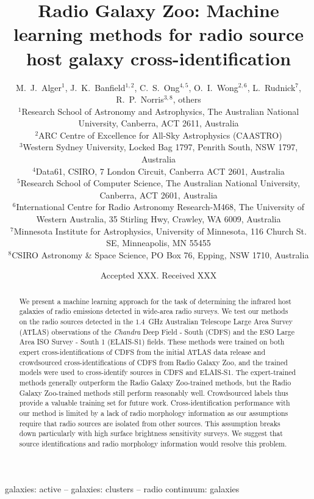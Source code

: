 \documentclass[fleqn,usenatbib,usedcolumn]{mnras}
\title[Machine learning methods for radio source cross-identification]{Radio Galaxy Zoo: Machine learning methods for radio source host galaxy cross-identification}
\author[Alger et al.]{M.~J.~Alger$^{1}$, J.~K.~Banfield$^{1, 2}$, C.~S.~Ong$^{4, 5}$, O.~I.~Wong$^{2, 6}$, L.~Rudnick$^{7}$, R.~P.~Norris$^{3, 8}$, others
\\
$^{1}$Research School of Astronomy and Astrophysics, The Australian National University, Canberra, ACT 2611, Australia\\
$^{2}$ARC Centre of Excellence for All-Sky Astrophysics (CAASTRO)\\
$^{3}$Western Sydney University, Locked Bag 1797, Penrith South, NSW 1797, Australia\\
$^{4}$Data61, CSIRO, 7 London Circuit, Canberra ACT 2601, Australia\\
$^{5}$Research School of Computer Science, The Australian National University, Canberra, ACT 2601, Australia\\
$^{6}$International Centre for Radio Astronomy Research-M468, The University of Western Australia, 35 Stirling Hwy, Crawley, WA 6009, Australia\\
$^{7}$Minnesota Institute for Astrophysics, University of Minnesota, 116 Church St. SE, Minneapolis, MN 55455\\
$^{8}$CSIRO Astronomy \& Space Science, PO Box 76, Epping, NSW 1710, Australia
}
\date{Accepted XXX. Received XXX}
\begin{document}
\label{firstpage}
\pagerange{\pageref{firstpage}--\pageref{lastpage}}
\maketitle

\begin{abstract}
  We present a machine learning approach for the task of determining the
  infrared host galaxies of radio emissions detected in wide-area radio
  surveys. We test our methods on the radio sources detected in the $1.4$~GHz
  Australian Telescope Large Area Survey (ATLAS) observations of the
  \emph{Chandra} Deep Field - South (CDFS) and the ESO Large Area ISO Survey -
  South 1 (ELAIS-S1) fields. These methods were trained on both expert
  cross-identifications of CDFS from the initial ATLAS data release and
  crowdsourced cross-identifications of CDFS from Radio Galaxy Zoo, and the
  trained models were used to cross-identify sources in CDFS and ELAIS-S1. The
  expert-trained methods generally outperform the Radio Galaxy Zoo-trained
  methods, but the Radio Galaxy Zoo-trained methods still perform reasonably
  well. Crowdsourced labels thus provide a valuable training set for future
  work.  %
  Cross-identification performance with our method is limited by a lack of
  radio morphology information as our assumptions require that radio sources
  are isolated from other sources. This assumption breaks down particularly
  with high surface brightness sensitivity surveys. We suggest that source
  identifications and radio morphology information would resolve this problem.
\end{abstract}

\begin{keywords}
galaxies: active -- galaxies: clusters -- radio continuum: galaxies
\end{keywords}
\end{document}

